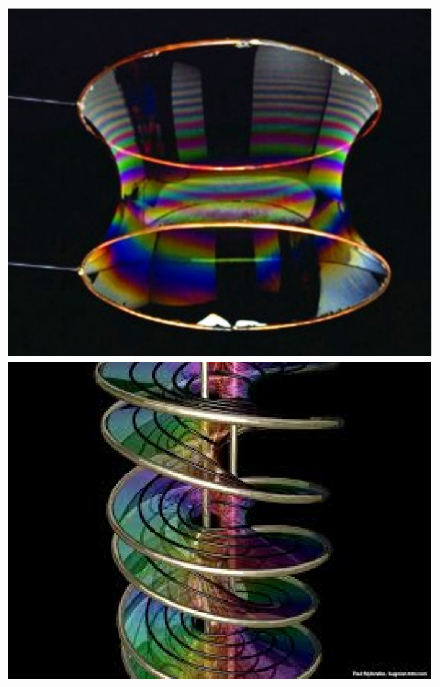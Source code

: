 \documentclass {report}
\begin{document}
\begin{figure}[h!]
   \begin{minipage}[b]{0.5\linewidth}
      \centering \includegraphics[scale=0.25]{Images_Fichiers/savoncaten.eps}
   \end{minipage}
   \begin{minipage}[b]{0.5\linewidth}   
     \centering \includegraphics[scale=0.6]{Images_Fichiers/savonhelico.eps}
   \end{minipage}
\end{figure}
\end{document}
